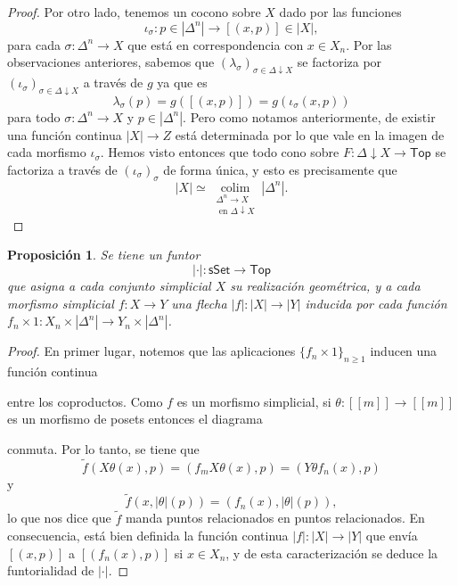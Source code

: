 \documentclass[11pt]{report}
\theoremstyle{colored}
\newtheorem{proposition}{Proposición}[section]
\newcommand{\nat}[1]{[\![#1]\!]}
\newcommand{\ord}[1]{\nat{#1}}
\newcommand{\cat}[1]{\mathsf{#1}}
\renewcommand{\ss}[1]{\Delta^{#1}}
\newcommand{\catcolim}[2]{\underset{#1}{\operatorname{colim}}#2}
\begin{document}
\begin{proof}
Por otro lado, tenemos un cocono sobre $X$ dado por las funciones
\[
\iota_\sigma : p \in |\ss{n}| \to [(x,p)] \in |X|,
\]
para cada $\sigma : \ss{n} \to X$ que está en correspondencia con $x \in X_n$. Por las observaciones anteriores, sabemos que $(\lambda_\sigma)_{\sigma \in \Delta \downarrow X}$ se factoriza por $(\iota_\sigma)_{\sigma \in \Delta \downarrow X}$ a través de $g$ ya que es
\[
\lambda_\sigma(p) = g([(x,p)]) = g(\iota_\sigma(x,p))
\]
para todo $\sigma : \ss{n} \to X$ y $p \in |\ss{n}|$. Pero como notamos anteriormente, de existir una función continua $|X| \to Z$ está determinada por lo que vale en la imagen de cada morfismo $\iota_\sigma$. 
Hemos visto entonces que todo cono sobre $F : \Delta \downarrow X \to \mathsf{Top}$ se factoriza a través de $(\iota_\sigma)_\sigma$ de forma única, y esto es precisamente que
\[
|X| \simeq \catcolim{\substack{\ss{n} \to X \\ \text{ en $\Delta \downarrow X$}}}{|\ss{n}|}.
\]
\end{proof}

\begin{proposition} Se tiene un funtor
\[
| \cdot | : \cat{sSet} \to \cat{Top}
\]
que asigna a cada conjunto simplicial $X$ su realización geométrica, y a cada morfismo simplicial $f : X \to Y$ una flecha $|f| : |X| \to |Y|$ inducida por cada función $f_n \times 1 : X_n \times |\ss{n}| \to Y_n \times |\ss{n}|$.
\end{proposition}
\begin{proof} En primer lugar, notemos que las aplicaciones $\{f_n \times 1\}_{n \geq 1}$ inducen una función continua
\begin{center}
\end{center}

entre los coproductos. Como $f$ es un morfismo simplicial, si $\theta : \ord{m} \to \ord{m}$ es un morfismo de posets entonces el diagrama
\begin{center}
\end{center}
conmuta. Por lo tanto, se tiene que
\[
\widetilde{f}(X\theta(x),p) = (f_mX\theta(x),p) = (Y\theta f_n(x),p)
\]
y
\[
\widetilde{f}(x,|\theta|(p)) = (f_n(x),|\theta|(p)),
\]
lo que nos dice que $\widetilde{f}$ manda puntos relacionados en puntos relacionados. En consecuencia, está bien definida la función continua $|f| : |X| \to |Y|$ que envía $[(x,p)]$ a $[(f_n(x),p)]$ si $x \in X_n$, y de esta caracterización se deduce la funtorialidad de $|\cdot|$.
\end{proof}
\end{document}
